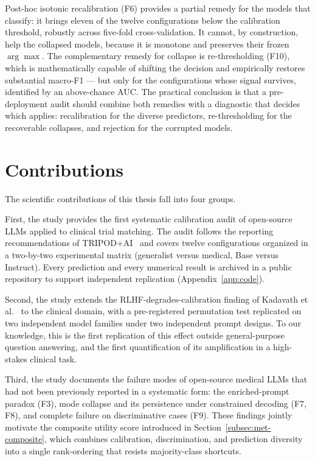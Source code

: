 Post-hoc isotonic recalibration (F6) provides a partial remedy for the 
models that classify: it brings eleven of the twelve configurations 
below the calibration threshold, robustly across five-fold 
cross-validation. It cannot, by construction, help the collapsed models, 
because it is monotone and preserves their frozen $\arg\max$. The 
complementary remedy for collapse is re-thresholding (F10), which is 
mathematically capable of shifting the decision and empirically restores 
substantial macro-F1 --- but only for the configurations whose signal 
survives, identified by an above-chance AUC. The practical conclusion is 
that a pre-deployment audit should combine both remedies with a 
diagnostic that decides which applies: recalibration for the diverse 
predictors, re-thresholding for the recoverable collapses, and rejection 
for the corrupted models.

\section{Contributions}
\label{sec:conc-contributions}

The scientific contributions of this thesis fall into four groups.

First, the study provides the first systematic calibration audit of 
open-source LLMs applied to clinical trial matching. The audit follows 
the reporting recommendations of TRIPOD+AI~\cite{collins2024tripod} and 
covers twelve configurations organized in a two-by-two experimental 
matrix (generalist versus medical, Base versus Instruct). Every 
prediction and every numerical result is archived in a public 
repository to support independent replication (Appendix~\ref{app:code}).

Second, the study extends the RLHF-degrades-calibration finding of 
Kadavath et al.~\cite{kadavath2022know} to the clinical domain, with a 
pre-registered permutation test replicated on two independent model 
families under two independent prompt designs. To our knowledge, this 
is the first replication of this effect outside general-purpose 
question answering, and the first quantification of its amplification 
in a high-stakes clinical task.

Third, the study documents the failure modes of open-source medical 
LLMs that had not been previously reported in a systematic form: the 
enriched-prompt paradox (F3), mode collapse and its persistence under 
constrained decoding (F7, F8), and complete failure on discriminative 
cases (F9). These findings jointly motivate the composite utility score 
introduced in Section~\ref{subsec:met-composite}, which combines 
calibration, discrimination, and prediction diversity into a single 
rank-ordering that resists majority-class shortcuts.

